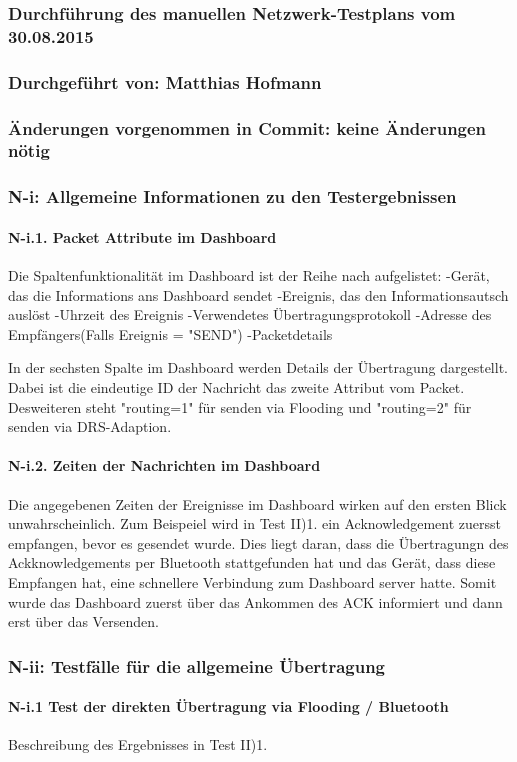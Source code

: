 \subsubsection{Durchführung des manuellen Netzwerk-Testplans vom 30.08.2015}

\subsubsection{Durchgeführt von: Matthias Hofmann}

\subsubsection{Änderungen vorgenommen in Commit: keine Änderungen nötig}

\subsubsection{N-i: Allgemeine Informationen zu den Testergebnissen}

\paragraph{N-i.1. Packet Attribute im Dashboard}
Die Spaltenfunktionalität im Dashboard ist der Reihe nach aufgelistet:
-Gerät, das die Informations ans Dashboard sendet
-Ereignis, das den Informationsautsch auslöst
-Uhrzeit des Ereignis
-Verwendetes Übertragungsprotokoll
-Adresse des Empfängers(Falls Ereignis = "SEND")
-Packetdetails

In der sechsten Spalte im Dashboard werden Details der Übertragung dargestellt. 
Dabei ist die eindeutige ID der Nachricht das zweite Attribut vom Packet.
Desweiteren steht "routing=1" für senden via Flooding und "routing=2" für senden via DRS-Adaption.

\paragraph{N-i.2. Zeiten der Nachrichten im Dashboard}
Die angegebenen Zeiten der Ereignisse im Dashboard wirken auf den ersten Blick unwahrscheinlich. 
Zum Beispeiel wird in Test II)1. ein Acknowledgement zuersst empfangen, bevor es gesendet wurde.
Dies liegt daran, dass die Übertragungn des Ackknowledgements per Bluetooth stattgefunden hat und das Gerät, 
dass diese Empfangen hat, eine schnellere Verbindung zum Dashboard server hatte. 
Somit wurde das Dashboard zuerst über das Ankommen des ACK informiert und dann erst über das Versenden.


\subsubsection{N-ii: Testfälle für die allgemeine Übertragung}

\paragraph{N-i.1 Test der direkten Übertragung via Flooding / Bluetooth}
Beschreibung des Ergebnisses in Test II)1.